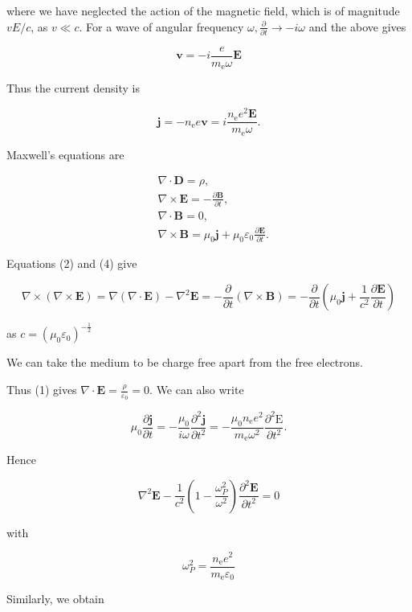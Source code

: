 \documentclass[10pt]{article}
\begin{document}
where we have neglected the action of the magnetic field, which is of magnitude $v E / c$, as $v \ll c$. For a wave of angular frequency $\omega, \frac{\partial}{\partial t} \rightarrow-i \omega$ and the above gives

$$
\mathbf{v}=-i \frac{e}{m_{\mathrm{e}} \omega} \mathbf{E}
$$

Thus the current density is

$$
\mathbf{j}=-n_{\mathrm{e}} e \mathbf{v}=i \frac{n_{\mathrm{e}} e^{2} \mathbf{E}}{m_{\mathrm{e}} \omega} .
$$

 Maxwell's equations are

$$
\begin{aligned}
&\nabla \cdot \mathbf{D}=\rho, \\
&\nabla \times \mathbf{E}=-\frac{\partial \mathbf{B}}{\partial t}, \\
&\nabla \cdot \mathbf{B}=0, \\
&\nabla \times \mathbf{B}=\mu_{0} \mathbf{j}+\mu_{0} \varepsilon_{0} \frac{\partial \mathbf{E}}{\partial t} .
\end{aligned}
$$

Equations (2) and (4) give

$$
\nabla \times(\nabla \times \mathbf{E})=\nabla(\nabla \cdot \mathbf{E})-\nabla^{2} \mathbf{E}=-\frac{\partial}{\partial t}(\nabla \times \mathbf{B})=-\frac{\partial}{\partial t}\left(\mu_{0} \mathbf{j}+\frac{1}{c^{2}} \frac{\partial \mathbf{E}}{\partial t}\right)
$$

as $c=\left(\mu_{0} \varepsilon_{0}\right)^{-\frac{1}{2}}$

We can take the medium to be charge free apart from the free electrons.

Thus (1) gives $\nabla \cdot \mathbf{E}=\frac{\rho}{\varepsilon_{0}}=0$. We can also write

$$
\mu_{0} \frac{\partial \mathbf{j}}{\partial t}=-\frac{\mu_{0}}{i \omega} \frac{\partial^{2} \mathbf{j}}{\partial t^{2}}=-\frac{\mu_{0} n_{\mathrm{e}} e^{2}}{m_{\mathrm{e}} \omega^{2}} \frac{\partial^{2} \mathrm{E}}{\partial t^{2}} .
$$

Hence

$$
\nabla^{2} \mathbf{E}-\frac{1}{c^{2}}\left(1-\frac{\omega_{P}^{2}}{\omega^{2}}\right) \frac{\partial^{2} \mathbf{E}}{\partial t^{2}}=0
$$

with

$$
\omega_{P}^{2}=\frac{n_{\mathrm{e}} e^{2}}{m_{\mathrm{e}} \varepsilon_{0}}
$$

Similarly, we obtain
\end{document}
